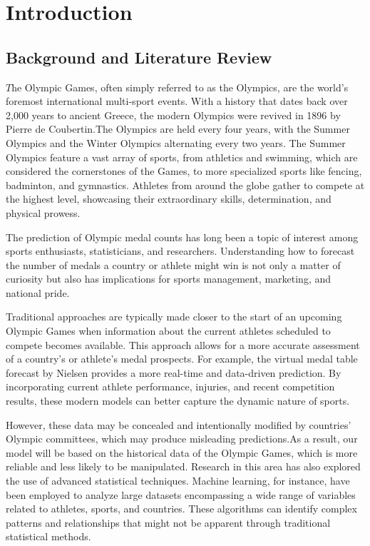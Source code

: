 \section{Introduction}

\subsection{Background and Literature Review}

$T$he Olympic Games, often simply referred to as the Olympics, are the world's foremost international multi-sport events. With a history that dates back over 2,000 years to ancient Greece, the modern Olympics were revived in 1896 by Pierre de Coubertin.The Olympics are held every four years, with the Summer Olympics and the Winter Olympics alternating every two years. The Summer Olympics feature a vast array of sports, from athletics and swimming, which are considered the cornerstones of the Games, to more specialized sports like fencing, badminton, and gymnastics. Athletes from around the globe gather to compete at the highest level, showcasing their extraordinary skills, determination, and physical prowess.

The prediction of Olympic medal counts has long been a topic of interest among sports enthusiasts, statisticians, and researchers. Understanding how to forecast the number of medals a country or athlete might win is not only a matter of curiosity but also has implications for sports management, marketing, and national pride. \cite{wilson2019forecasting}

Traditional approaches are typically made closer to the start of an upcoming Olympic Games when information about the current athletes scheduled to compete becomes available. This approach allows for a more accurate assessment of a country's or athlete's medal prospects\cite{3}. For example, the virtual medal table forecast by Nielsen \cite{1} provides a more real-time and data-driven prediction. By incorporating current athlete performance, injuries, and recent competition results, these modern models can better capture the dynamic nature of sports.\cite{morgan2011predictive}

However, these data may be concealed and intentionally modified by countries' Olympic committees\cite{5}, which may produce misleading predictions.As a result, our model will be based on the historical data of the Olympic Games, which is more reliable and less likely to be manipulated.
Research in this area has also explored the use of advanced statistical techniques. Machine learning, for instance, have been employed to analyze large datasets encompassing a wide range of variables related to athletes, sports, and countries. These algorithms can identify complex patterns and relationships that might not be apparent through traditional statistical methods.\cite{anderson2015review,jackson2014statistical,roberts2013olympic}

